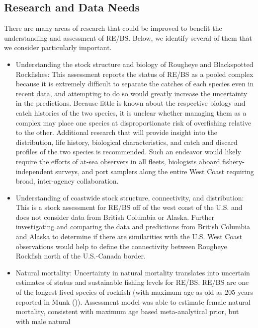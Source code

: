 \documentclass[
]{scrartcl}
\begin{document}
\subsection{Research and Data Needs}\label{research-and-data-needs-1}

There are many areas of research that could be improved to benefit the
understanding and assessment of RE/BS. Below, we identify several of
them that we consider particularly important.

\begin{itemize}
\item
  Understanding the stock structure and biology of Rougheye and
  Blackspotted Rockfishes: This assessment reports the status of RE/BS
  as a pooled complex because it is extremely difficult to separate the
  catches of each species even in recent data, and attempting to do so
  would greatly increase the uncertainty in the predictions. Because
  little is known about the respective biology and catch histories of
  the two species, it is unclear whether managing them as a complex may
  place one species at disproportionate risk of overfishing relative to
  the other. Additional research that will provide insight into the
  distribution, life history, biological characteristics, and catch and
  discard profiles of the two species is recommended. Such an endeavor
  would likely require the efforts of at-sea observers in all fleets,
  biologists aboard fishery-independent surveys, and port samplers along
  the entire West Coast requiring broad, inter-agency collaboration.
\item
  Understanding of coastwide stock structure, connectivity, and
  distribution: This is a stock assessment for RE/BS off of the west
  coast of the U.S. and does not consider data from British Columbia or
  Alaska. Further investigating and comparing the data and predictions
  from British Columbia and Alaska to determine if there are
  similarities with the U.S. West Coast observations would help to
  define the connectivity between Rougheye Rockfish north of the
  U.S.-Canada border.
\item
  Natural mortality: Uncertainty in natural mortality translates into
  uncertain estimates of status and sustainable fishing levels for
  RE/BS. RE/BS are one of the longest lived species of rockfish (with
  maximum age as old as 205 years reported in Munk
  ()). Assessment
  model was able to estimate female natural mortality, consistent with
  maximum age based meta-analytical prior, but with male natural

\end{itemize}
\end{document}
